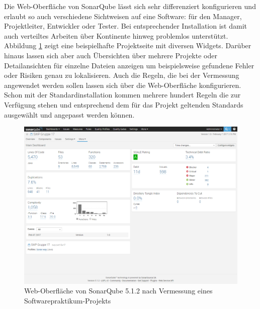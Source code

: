 \documentclass[gb,ngerman]{stthesis}
\begin{document}
		Die Web-Oberfläche von SonarQube lässt sich sehr differenziert konfigurieren und erlaubt so auch verschiedene Sichtweisen auf eine Software: für den Manager, Projektleiter, Entwickler oder Tester. Bei entsprechender Installation ist damit auch verteiltes Arbeiten über Kontinente hinweg problemlos unterstützt. Abbildung \ref{sonarqube} zeigt eine beispielhafte Projektseite mit diversen Widgets. Darüber hinaus lassen sich aber auch Übersichten über mehrere Projekte oder Detailansichten für einzelne Dateien anzeigen um beispielsweise gefundene Fehler oder Risiken genau zu lokalisieren. Auch die Regeln, die bei der Vermessung angewendet werden sollen lassen sich über die Web-Oberfläche konfigurieren. Schon mit der Standardinstallation kommen mehrere hundert Regeln die zur Verfügung stehen und entsprechend dem für das Projekt geltenden Standards ausgewählt und angepasst werden können.
		\begin{figure} [h]
				\includegraphics [width=\textwidth] {sonarqube.png}
				\caption{Web-Oberfläche von SonarQube 5.1.2 nach Vermessung eines Softwarepraktikum-Projekts}
				\label{sonarqube}
		\end{figure}
\end{document}
